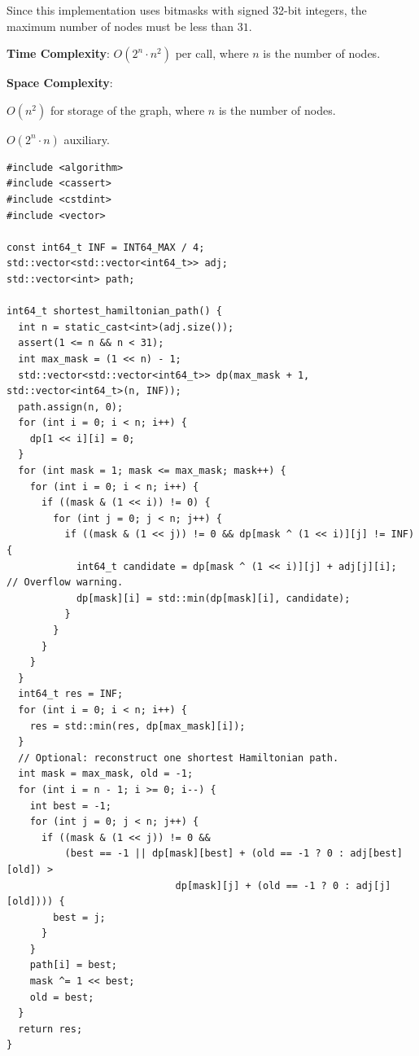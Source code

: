 Since this implementation uses bitmasks with signed 32-bit integers, the maximum number of nodes must be less than $31$.

\textbf{Time Complexity}: $O(2^{n} \cdot n^{2})$ per call, where $n$ is the number of nodes.

\textbf{Space Complexity}:
\begin{compactitem}
  \item $O(n^{2})$ for storage of the graph, where $n$ is the number of nodes.
  \item $O(2^{n} \cdot n)$ auxiliary.
\end{compactitem}

\begin{lstlisting}[style=cpp]
#include <algorithm>
#include <cassert>
#include <cstdint>
#include <vector>

const int64_t INF = INT64_MAX / 4;
std::vector<std::vector<int64_t>> adj;
std::vector<int> path;

int64_t shortest_hamiltonian_path() {
  int n = static_cast<int>(adj.size());
  assert(1 <= n && n < 31);
  int max_mask = (1 << n) - 1;
  std::vector<std::vector<int64_t>> dp(max_mask + 1, std::vector<int64_t>(n, INF));
  path.assign(n, 0);
  for (int i = 0; i < n; i++) {
    dp[1 << i][i] = 0;
  }
  for (int mask = 1; mask <= max_mask; mask++) {
    for (int i = 0; i < n; i++) {
      if ((mask & (1 << i)) != 0) {
        for (int j = 0; j < n; j++) {
          if ((mask & (1 << j)) != 0 && dp[mask ^ (1 << i)][j] != INF) {
            int64_t candidate = dp[mask ^ (1 << i)][j] + adj[j][i];  // Overflow warning.
            dp[mask][i] = std::min(dp[mask][i], candidate);
          }
        }
      }
    }
  }
  int64_t res = INF;
  for (int i = 0; i < n; i++) {
    res = std::min(res, dp[max_mask][i]);
  }
  // Optional: reconstruct one shortest Hamiltonian path.
  int mask = max_mask, old = -1;
  for (int i = n - 1; i >= 0; i--) {
    int best = -1;
    for (int j = 0; j < n; j++) {
      if ((mask & (1 << j)) != 0 &&
          (best == -1 || dp[mask][best] + (old == -1 ? 0 : adj[best][old]) >
                             dp[mask][j] + (old == -1 ? 0 : adj[j][old]))) {
        best = j;
      }
    }
    path[i] = best;
    mask ^= 1 << best;
    old = best;
  }
  return res;
}


\end{lstlisting}
